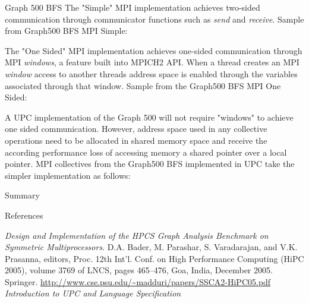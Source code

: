 \documentclass[final]{beamer}
\begin{document}
\begin{frame}[t]
\begin{columns}[t]
\begin{column}{0.28\paperwidth}
\begin{block}{Graph 500 BFS}
					The "Simple" MPI implementation achieves two-sided communication through communicator functions such as  \emph{send} and \emph{receive}. Sample from Graph500 BFS MPI Simple:\vspace{2 mm}
					
					 \vspace{5 mm}
					  The "One Sided" MPI implementation achieves one-sided communication through MPI \emph{windows}, a feature built into MPICH2 API.  When a thread creates an MPI \emph{window} access to another threads address space is enabled through the variables associated through that window.  Sample from the Graph500 BFS MPI One Sided: 
					  \vspace{2 mm}
					   
					  \vspace{5 mm}
					  A UPC implementation of the Graph 500 will not require "windows" to achieve one sided communication.  However, address space used in any collective operations need to be allocated in shared memory space and receive the according performance loss of accessing memory a shared pointer over a local pointer.  MPI collectives from the Graph500 BFS implemented in UPC take the simpler implementation as follows: 
					  \vspace{2 mm}
					   
				\end{block}
				\begin{block}{Summary}
				\end{block}
				\begin{block}{References}
					\begin{thebibliography}{7}
						{\tiny
							\emph{Design and Implementation of the HPCS Graph Analysis Benchmark
on Symmetric Multiprocessors}. D.A. Bader, M. Parashar, S. Varadarajan, and V.K. Prasanna, editors, Proc. 12th Int'l. Conf. on High Performance Computing (HiPC 2005), volume 3769 of LNCS, pages 465--476, Goa, India, December 2005. Springer.
							\url{http://www.cse.psu.edu/~madduri/papers/SSCA2-HiPC05.pdf}
							\emph{Introduction to UPC and Language Specification}
}
\end{thebibliography}
\end{block}
\end{column}
\end{columns}
\end{frame}
\end{document}
